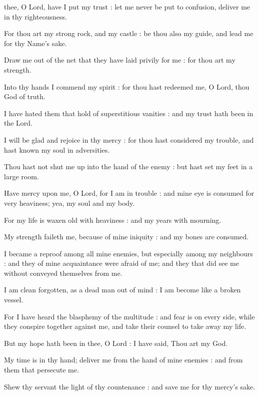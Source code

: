  thee, O Lord, have I put my trust : let me never be put to confusion, deliver me in thy righteousness.\par
{}
For thou art my strong rock, and my castle : be thou also my guide, and lead me for thy Name's sake.\par
{}Draw me out of the net that they have laid privily for me : for thou art my strength.\par
{}Into thy hands I commend my spirit : for thou hast redeemed me, O Lord, thou God of truth.\par
{}I have hated them that hold of superstitious vanities : and my trust hath been in the Lord.\par
{}I will be glad and rejoice in thy mercy : for thou hast considered my trouble, and hast known my soul in adversities.\par
{}Thou hast not shut me up into the hand of the enemy : but hast set my feet in a large room.\par
{}Have mercy upon me, O Lord, for I am in trouble : and mine eye is consumed for very heaviness; yea, my soul and my body.\par
{}For my life is waxen old with heaviness : and my years with mourning.\par
{}My strength faileth me, because of mine iniquity : and my bones are consumed.\par
{}I became a reproof among all mine enemies, but especially among my neighbours : and they of mine acquaintance were afraid of me; and they that did see me without conveyed themselves from me.\par
{}I am clean forgotten, as a dead man out of mind : I am become like a broken vessel.\par
{}For I have heard the blasphemy of the multitude : and fear is on every side, while they conspire together against me, and take their counsel to take away my life.\par
{}But my hope hath been in thee, O Lord : I have said, Thou art my God.\par
{}My time is in thy hand; deliver me from the hand of mine enemies : and from them that persecute me.\par
{}Shew thy servant the light of thy countenance : and save me for thy mercy's sake.\par
